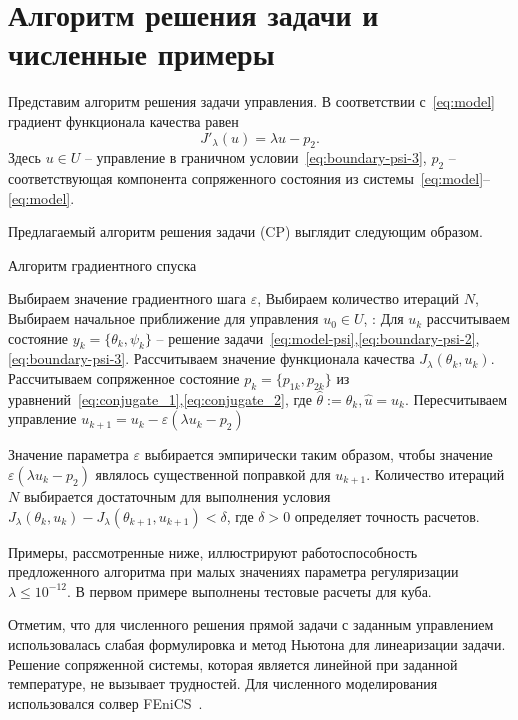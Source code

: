 \section{Алгоритм решения задачи и численные примеры}\label{sec:experiments}
Представим алгоритм решения задачи управления.
В соответствии с~\eqref{eq:model} градиент функционала качества равен
\[
    J'_\lambda (u) = \lambda u - p_2.
\]
Здесь $u\in U$ -- управление в граничном условии~\eqref{eq:boundary-psi-3}, $p_2$ -- соответствующая компонента
сопряженного состояния из системы~\eqref{eq:model}--\eqref{eq:model}.

Предлагаемый алгоритм решения задачи (CP) выглядит следующим образом.
\begin{algorithm}[H]
    \caption{Алгоритм градиентного спуска}
    \begin{algorithmic}[1]
        \State Выбираем значение градиентного шага $\varepsilon$,
        \State Выбираем количество итераций $N$,
        \State Выбираем начальное приближение для управления $u_0 \in U$,
            :
            \State Для $u_k$ рассчитываем состояние $ y_k = \{\theta_k, \psi_k\} $ --
            решение задачи~\eqref{eq:model-psi},\eqref{eq:boundary-psi-2},\eqref{eq:boundary-psi-3}.
            \State Рассчитываем значение функционала качества $J_\lambda(\theta_k, u_k)$.
            \State Рассчитываем сопряженное состояние $p_k=\{p_{1k},p_{2k}\}$ из
            уравнений~\eqref{eq:conjugate_1},\eqref{eq:conjugate_2},
            где $ \hat{\theta} := \theta_k, \hat{u}=u_k$.
            \State Пересчитываем управление $u_{k+1} = u_k - \varepsilon (\lambda u_k - p_2)$
        \EndFor
    \end{algorithmic}\label{alg:algorithm}
\end{algorithm}

Значение параметра $\varepsilon$ выбирается эмпирически таким образом, чтобы значение
$\varepsilon (\lambda u_k - p_2)$ являлось существенной поправкой для $u_{k+1}$.
Количество итераций $N$ выбирается достаточным для выполнения условия
$J_\lambda(\theta_k, u_k) - J_\lambda(\theta_{k+1}, u_{k+1}) < \delta$, где $\delta>0$ определяет точность расчетов.

Примеры, рассмотренные ниже, иллюстрируют работоспособность предложенного алгоритма при
малых значениях параметра регуляризации $\lambda \leq 10^{-12}$.
В первом примере выполнены тестовые расчеты для куба.

Отметим, что для численного решения прямой задачи с заданным
управлением использовалась слабая формулировка
и метод Ньютона для линеаризации задачи.
Решение сопряженной системы, которая является линейной при
заданной температуре, не вызывает трудностей.
Для численного моделирования использовался солвер FEniCS~\cite{fenics, dolfin}.

